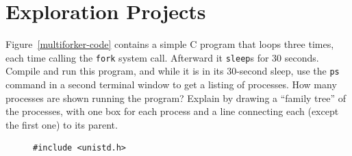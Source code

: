 \section*{Exploration Projects}
\begin{chapterEnumerate}
\item
Figure~\ref{multiforker-code}
contains a simple C program
that loops three times, each time calling the \verb|fork| system
call.  Afterward it
\verb|sleep|s for 30 seconds.  Compile and run this program,
and while it is in its 30-second sleep, use the \verb|ps| command
in a second terminal
window
to get a listing of processes.  How many processes are shown running
the program?  Explain by drawing a ``family tree''
of the processes, with one box for each process and a line connecting
each (except the first one) to its parent.
\begin{figure}
\begin{verbatim}
#include <unistd.h>


\end{verbatim}
\end{figure}
\end{chapterEnumerate}
